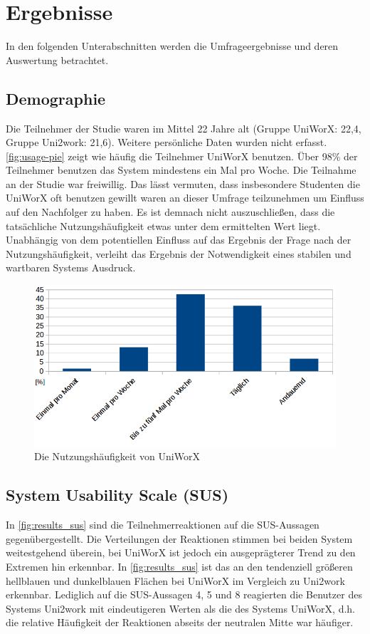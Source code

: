 \documentclass[11pt,a4paper,twoside,ngerman]{article}
\begin{document}
\clearpage
\section{Ergebnisse}
In den folgenden Unterabschnitten werden die Umfrageergebnisse und deren Auswertung betrachtet.

\subsection{Demographie}
Die Teilnehmer der Studie waren im Mittel 22 Jahre alt (Gruppe UniWorX: 22,4, Gruppe Uni2work: 21,6). Weitere persönliche Daten wurden nicht erfasst.
\autoref{fig:usage-pie} zeigt wie häufig die Teilnehmer UniWorX benutzen. Über 98\% der Teilnehmer benutzen das System mindestens ein Mal pro Woche.
Die Teilnahme an der Studie war freiwillig. Das lässt vermuten, dass insbesondere Studenten die UniWorX oft benutzen gewillt waren an dieser Umfrage teilzunehmen um Einfluss auf den Nachfolger zu haben. Es ist demnach nicht auszuschließen, dass die tatsächliche Nutzungshäufigkeit etwas unter dem ermittelten Wert liegt. Unabhängig von dem potentiellen Einfluss auf das Ergebnis der Frage nach der Nutzungshäufigkeit, verleiht das Ergebnis der Notwendigkeit eines stabilen und wartbaren Systems Ausdruck.

\begin{figure}[h]
    \centering
    \includegraphics[width=\textwidth]{images/uniworx_usage.png}
    \caption{Die Nutzungshäufigkeit von UniWorX}
    \label{fig:usage-pie}
\end{figure}

\subsection{System Usability Scale (SUS)} \label{sec:results_sus}
In \autoref{fig:results_sus} sind die Teilnehmerreaktionen auf die SUS-Aussagen gegenübergestellt. Die Verteilungen der Reaktionen stimmen bei beiden System weitestgehend überein, bei UniWorX ist jedoch ein ausgeprägterer Trend zu den Extremen hin erkennbar. In \autoref{fig:results_sus} ist das an den tendenziell größeren hellblauen und dunkelblauen Flächen bei UniWorX im Vergleich zu Uni2work erkennbar. Lediglich auf die SUS-Aussagen 4, 5 und 8 reagierten die Benutzer des Systems Uni2work mit eindeutigeren Werten als die des Systems UniWorX, d.h. die relative Häufigkeit der Reaktionen abseits der neutralen Mitte war häufiger.
\end{document}
